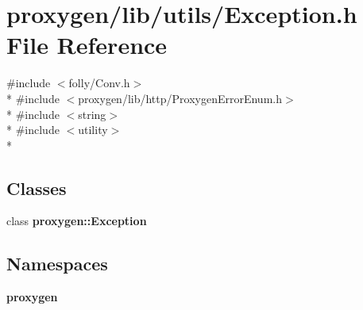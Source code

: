 \section{proxygen/lib/utils/\+Exception.h File Reference}
\label{Exception_8h}
{\ttfamily \#include $<$folly/\+Conv.\+h$>$}\\*
{\ttfamily \#include $<$proxygen/lib/http/\+Proxygen\+Error\+Enum.\+h$>$}\\*
{\ttfamily \#include $<$string$>$}\\*
{\ttfamily \#include $<$utility$>$}\\*
\subsection*{Classes}
\begin{DoxyCompactItemize}
\item 
class {\bf proxygen\+::\+Exception}
\end{DoxyCompactItemize}
\subsection*{Namespaces}
\begin{DoxyCompactItemize}
\item 
 {\bf proxygen}
\end{DoxyCompactItemize}
